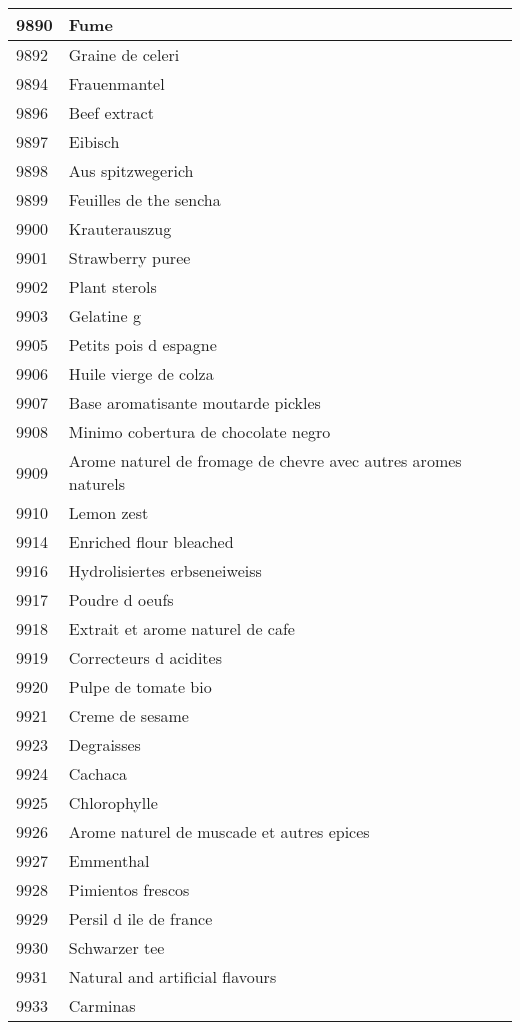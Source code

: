 \begin{longtable}{|l|l|}
9890 & Fume \\ \hline 
9892 & Graine de celeri \\ \hline 
9894 & Frauenmantel \\ \hline 
9896 & Beef extract \\ \hline 
9897 & Eibisch \\ \hline 
9898 & Aus spitzwegerich \\ \hline 
9899 & Feuilles de the sencha \\ \hline 
9900 & Krauterauszug \\ \hline 
9901 & Strawberry puree \\ \hline 
9902 & Plant sterols \\ \hline 
9903 & Gelatine g \\ \hline 
9905 & Petits pois d espagne \\ \hline 
9906 & Huile vierge de colza \\ \hline 
9907 & Base aromatisante moutarde pickles \\ \hline 
9908 & Minimo cobertura de chocolate negro \\ \hline 
9909 & Arome naturel de fromage de chevre avec autres aromes naturels \\ \hline 
9910 & Lemon zest \\ \hline 
9914 & Enriched flour bleached \\ \hline 
9916 & Hydrolisiertes erbseneiweiss \\ \hline 
9917 & Poudre d oeufs \\ \hline 
9918 & Extrait et arome naturel de cafe \\ \hline 
9919 & Correcteurs d acidites \\ \hline 
9920 & Pulpe de tomate bio \\ \hline 
9921 & Creme de sesame \\ \hline 
9923 & Degraisses \\ \hline 
9924 & Cachaca \\ \hline 
9925 & Chlorophylle \\ \hline 
9926 & Arome naturel de muscade et autres epices \\ \hline 
9927 & Emmenthal \\ \hline 
9928 & Pimientos frescos \\ \hline 
9929 & Persil d ile de france \\ \hline 
9930 & Schwarzer tee \\ \hline 
9931 & Natural and artificial flavours \\ \hline 
9933 & Carminas \\ \hline 

\end{longtable}
